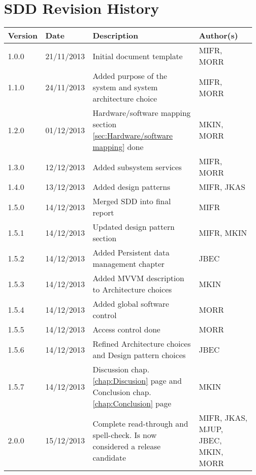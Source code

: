 \section{SDD Revision History}
\begin{center}
    \begin{tabular}{ | l | l | p{6cm} | p{4cm} |}
    \hline
    Version & Date & Description & Author(s) 
    \\ \hline
    1.0.0 & 21/11/2013 & Initial document template & MIFR, MORR
    \\ \hline
    1.1.0 & 24/11/2013 & Added purpose of the system and system architecture choice & MIFR, MORR
    \\ \hline
    1.2.0 & 01/12/2013 & Hardware/software mapping section \ref{sec:Hardware/software mapping} done & MKIN, MORR
    \\ \hline
    1.3.0 & 12/12/2013 & Added subsystem services & MIFR, MORR
    \\ \hline
    1.4.0 & 13/12/2013 & Added design patterns & MIFR, JKAS
    \\ \hline
    1.5.0 & 14/12/2013 & Merged SDD into final report & MIFR
    \\ \hline
    1.5.1 & 14/12/2013 & Updated design pattern section & MIFR, MKIN
    \\ \hline
    1.5.2 & 14/12/2013 & Added Persistent data management chapter & JBEC
    \\ \hline
    1.5.3 & 14/12/2013 & Added MVVM description to Architecture choices & MKIN
    \\ \hline
    1.5.4 & 14/12/2013 & Added global software control & MORR
    \\ \hline
    1.5.5 & 14/12/2013 & Access control done & MORR
    \\ \hline
    1.5.6 & 14/12/2013 & Refined Architecture choices and Design pattern choices & JBEC
    \\ \hline
    1.5.7 & 14/12/2013 & Discussion chap. \ref{chap:Discusion} page \pageref{chap:Discusion} and Conclusion chap. \ref{chap:Conclusion} page \pageref{chap:Conclusion} & MKIN
    \\ \hline
    2.0.0 & 15/12/2013 & Complete read-through and spell-check. Is now considered a release candidate & MIFR, JKAS, MJUP, JBEC, MKIN, MORR
    \\ \hline
    \end{tabular}
\end{center}
\newpage
